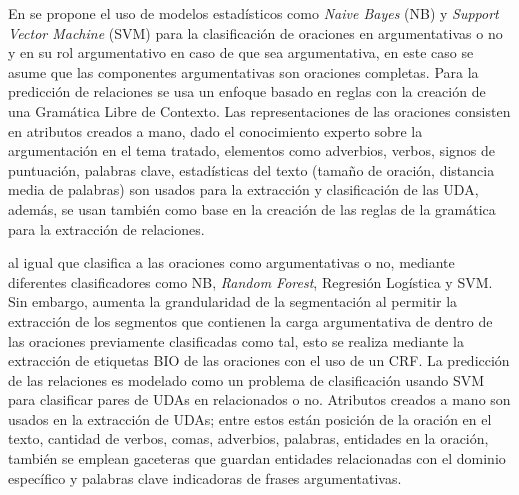 En \textcite{palau2009argumentation} se propone
el uso de modelos estadísticos como \emph{Naive Bayes} (NB) y \emph{Support Vector Machine} (SVM) 
para la clasificación de 
oraciones en argumentativas o no y en su rol argumentativo en caso de que sea argumentativa, en este
caso se asume que las componentes argumentativas son oraciones completas. Para la predicción de relaciones
se usa un enfoque basado en reglas con la creación de una Gramática Libre de Contexto. Las representaciones
de las oraciones consisten en atributos creados a mano, dado el conocimiento experto sobre la argumentación
en el tema tratado, elementos como adverbios, verbos, signos de puntuación, palabras clave, estadísticas del texto
(tamaño de oración, distancia media de palabras) son usados para la extracción y clasificación de las UDA, además,
se usan también como base en la creación de las reglas de la gramática para la extracción de relaciones.

\textcite{goudas2015argument} al igual que \cite{palau2009argumentation} clasifica a las oraciones como
argumentativas o no, mediante diferentes clasificadores como NB, \emph{Random Forest}, Regresión
Logística y SVM. Sin embargo, \cite{goudas2015argument} aumenta la grandularidad de la segmentación al permitir
la extracción de los segmentos que contienen la carga argumentativa de dentro de las oraciones previamente clasificadas
como tal, esto se realiza mediante la extracción de etiquetas BIO de las oraciones con el uso de un 
CRF. La predicción de las relaciones es modelado como un problema de clasificación
usando SVM para clasificar pares de UDAs en relacionados o no. Atributos creados a mano 
son usados en la extracción de UDAs; entre estos están posición de la oración en el texto, cantidad de verbos, comas, adverbios,
palabras, entidades en la oración, también se emplean gaceteras que guardan entidades relacionadas con el dominio 
específico y palabras clave indicadoras de frases argumentativas. 

